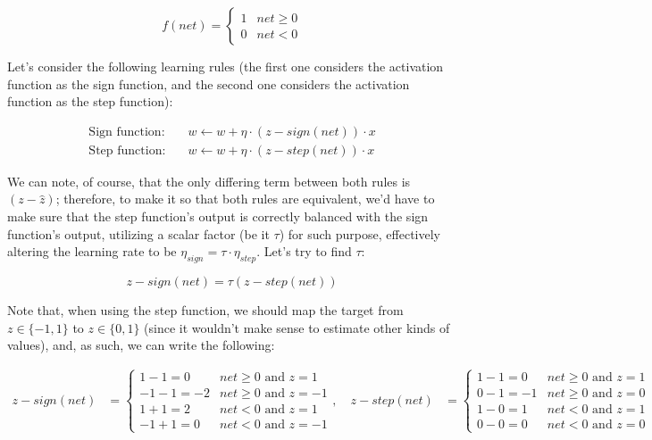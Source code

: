 \documentclass[12pt]{article}
\begin{document}
\begin{enumerate}[leftmargin=\labelsep]
\begin{enumerate}
{          $$
            f(net) = \begin{cases}
              1 & net \geq 0 \\
              0 & net < 0
            \end{cases}
          $$

          Let's consider the following learning rules (the first one considers
          the activation function as the sign function, and the second one
          considers the activation function as the step function):

          \begin{align*}
            \text{Sign function:} \quad & w \leftarrow w + \eta \cdot (z - sign(net)) \cdot x \\
            \text{Step function:} \quad & w \leftarrow w + \eta \cdot (z - step(net)) \cdot x
          \end{align*}

          We can note, of course, that the only differing term between both rules
          is $(z - \hat{z})$; therefore, to make it so that both rules are
          equivalent, we'd have to make sure that the step function's output
          is correctly balanced with the sign function's output, utilizing a scalar
          factor (be it $\tau$) for such purpose, effectively altering the learning
          rate to be $\eta_{sign} = \tau \cdot \eta_{step}$. Let's try to find $\tau$:

          $$
            z - sign(net) = \tau (z - step(net))
          $$

          Note that, when using the step function, we should map the target from
          $z \in \{-1, 1\}$ to $z \in \{0, 1\}$ (since it wouldn't make sense to
          estimate other kinds of values), and, as such, we can write
          the following:

          \begin{align*}
            z - sign(net) & = \begin{cases}
                                1 - 1 = 0  & net \geq 0 \text { and } z = 1  \\
                                -1 -1 = -2 & net \geq 0 \text { and } z = -1 \\
                                1 + 1 = 2  & net < 0 \text { and } z = 1     \\
                                -1 + 1 = 0 & net < 0 \text { and } z = -1
                              \end{cases}, \quad
            z - step(net) & = \begin{cases}
                                1 - 1 = 0  & net \geq 0 \text { and } z = 1 \\
                                0 - 1 = -1 & net \geq 0 \text { and } z = 0 \\
                                1 - 0 = 1  & net < 0 \text { and } z = 1    \\
                                0 - 0 = 0  & net < 0 \text { and } z = 0
                              \end{cases}
          \end{align*}

}
\end{enumerate}
\end{enumerate}
\end{document}
